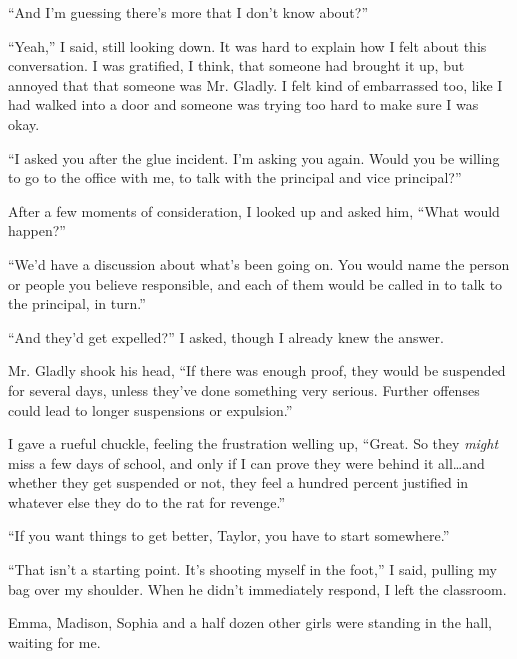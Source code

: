 ``And I'm guessing there's more that I don't know about?''



``Yeah,'' I said, still looking down.  It was hard to explain how I felt about this conversation.  I was gratified, I think, that someone had brought it up, but annoyed that that someone was Mr. Gladly.  I felt kind of embarrassed too, like I had walked into a door and someone was trying too hard to make sure I was okay.



``I asked you after the glue incident.  I'm asking you again.  Would you be willing to go to the office with me, to talk with the principal and vice principal?''



After a few moments of consideration, I looked up and asked him, ``What would happen?''



``We'd have a discussion about what's been going on.  You would name the person or people you believe responsible, and each of them would be called in to talk to the principal, in turn.''



``And they'd get expelled?'' I asked, though I already knew the answer.



Mr. Gladly shook his head, ``If there was enough proof, they would be suspended for several days, unless they've done something very serious.  Further offenses could lead to longer suspensions or expulsion.''



I gave a rueful chuckle, feeling the frustration welling up, ``Great.  So they \emph{might} miss a few days of school, and only if I can prove they were behind it all\ldots and whether they get suspended or not, they feel a hundred percent justified in whatever else they do to the rat for revenge.''



``If you want things to get better, Taylor, you have to start somewhere.''



``That isn't a starting point.  It's shooting myself in the foot,'' I said, pulling my bag over my shoulder.  When he didn't immediately respond, I left the classroom.



Emma, Madison, Sophia and a half dozen other girls were standing in the hall, waiting for me.





